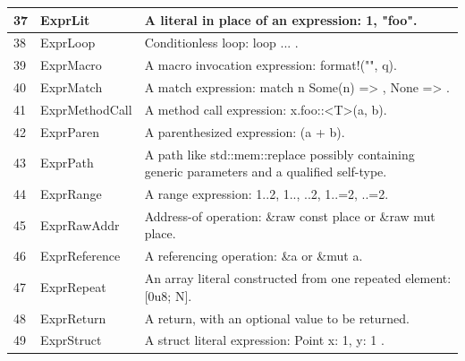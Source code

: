 \begin{longtable}{| p{} | p{} | p{} |}
37    & ExprLit                        & A literal in place of an expression: 1, "foo".                                                                 \\ \hline
38    & ExprLoop                       & Conditionless loop: loop { ... }.                                                                              \\ \hline
39    & ExprMacro                      & A macro invocation expression: format!("{}", q).                                                               \\ \hline
40    & ExprMatch                      & A match expression: match n { Some(n) => {}, None => {} }.                                                     \\ \hline
41    & ExprMethodCall                 & A method call expression: x.foo::<T>(a, b).                                                                    \\ \hline
42    & ExprParen                      & A parenthesized expression: (a + b).                                                                           \\ \hline
43    & ExprPath                       & A path like std::mem::replace possibly containing generic parameters and a qualified self-type.                \\ \hline
44    & ExprRange                      & A range expression: 1..2, 1.., ..2, 1..=2, ..=2.                                                               \\ \hline
45    & ExprRawAddr                    & Address-of operation: \&raw const place or \&raw mut place.                                                      \\ \hline
46    & ExprReference                  & A referencing operation: \&a or \&mut a.                                                                         \\ \hline
47    & ExprRepeat                     & An array literal constructed from one repeated element: [0u8; N].                                              \\ \hline
48    & ExprReturn                     & A return, with an optional value to be returned.                                                               \\ \hline
49    & ExprStruct                     & A struct literal expression: Point { x: 1, y: 1 }.                                                             \\ \hline

\end{longtable}
